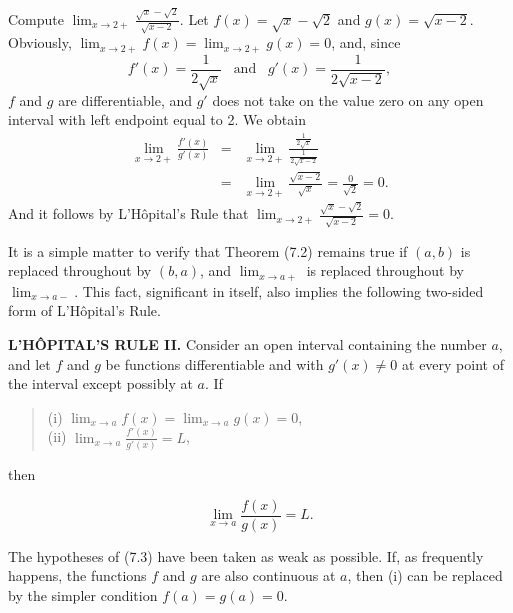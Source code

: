 \begin{example}
Compute $\lim_{x \rightarrow 2+}\frac{\sqrt x - \sqrt 2}{\sqrt{x-2}}.$ Let $f (x) = \sqrt x - \sqrt 2$ and $g(x) = \sqrt {x - 2}$. Obviously, $\lim_{x \rightarrow 2+} f(x) = \lim_{x \rightarrow 2+} g(x) = 0$, and, since
$$
f'(x)= \frac{1}{2\sqrt x} \;\;\; \mbox{and}\;\;\; g'(x)= \frac{1}{2\sqrt{x - 2}},
$$
$f$ and $g$ are differentiable, and  $g'$ does not take on the value zero on any open interval with left endpoint equal to 2. We obtain
\begin{eqnarray*}
\lim_{x \rightarrow 2+}\frac{f'(x)}{g'(x)} 
&=& \lim_{x \rightarrow 2+} \frac { \frac{1}{2 \sqrt x}} {\frac{1}{2 \sqrt{x - 2}} }\\
&=& \lim_{x \rightarrow 2+} \frac{\sqrt{x - 2}}{\sqrt x} = \frac{0}{\sqrt 2} = 0.
\end{eqnarray*}
And it follows by L'H\^{o}pital's Rule that $\lim_{x \rightarrow 2+} \frac{\sqrt x - \sqrt 2}{\sqrt{x-2}} = 0$.

It is a simple matter to verify that Theorem (7.2) remains true if $(a, b)$ is replaced throughout by $(b, a)$, and $\lim_{x \rightarrow a+}$ is replaced throughout by $\lim_{x \rightarrow a-}$.  This fact, significant in itself, also implies the following two-sided form of L'H\^{o}pital's Rule.
\end{example}

\begin{theorem} %
\textbf{L'H\^{O}PITAL'S RULE II.}  Consider an open interval containing the number $a$, and let $f$ and $g$ be functions differentiable and with $g'(x) \neq 0$ at every point of the interval except possibly at $a$. If


\begin{quote}
\begin{description}
\item[(i) $\lim_{x \rightarrow a} f(x) = \lim_{x \rightarrow a} g(x) = 0$,]
\item[(ii) $\lim_{x \rightarrow a} \frac{f'(x)}{g'(x)} = L$,]
\end{description}
\end{quote} 

\noindent then 

$$
\lim_{x \rightarrow a}\frac{ f(x)}{g(x)} = L.
$$

The hypotheses of (7.3) have been taken as weak as possible. If, as frequently happens, the functions $f$ and $g$ are also continuous at $a$, then (i) can be replaced by the simpler condition $f(a) = g(a) = 0$.
\end{theorem}

